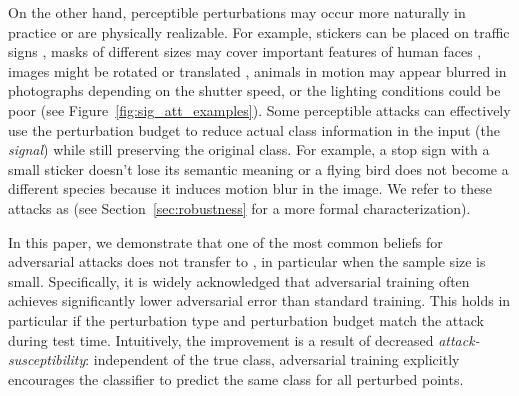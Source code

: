 On the other hand, perceptible perturbations may occur more naturally in practice or are physically realizable. 
For example, stickers can be placed on traffic signs \cite{Eykholt18},
masks of different sizes may cover important features of human faces
\cite{Wu20}, images might be rotated or translated \cite{Logan19},
animals in motion may appear blurred in photographs
depending on the shutter speed, or the lighting conditions could be poor (see Figure~\ref{fig:sig_att_examples}).
Some perceptible attacks can effectively
use the perturbation budget to reduce actual class information
in the input (the \emph{signal}) while still preserving the original class.
For example, a stop sign with a small sticker doesn't lose its semantic meaning
or a flying bird does not become a different species because it induces motion blur
in the image.
We refer to these attacks as \emph{\nameofattacks} (see
Section~\ref{sec:robustness} for a more formal
characterization). 

In this paper, we
demonstrate that one of the most common beliefs 
for adversarial attacks does not transfer to \nameofattacks, in
particular when the sample size is small. Specifically, it is widely acknowledged that adversarial training often achieves significantly lower adversarial error than standard
training. This holds in particular if %
the perturbation type 
\cite{madry18, zhang19, Bai21} and perturbation budget match the attack during test time. 
Intuitively, the improvement is a result of decreased
\emph{attack-susceptibility}: independent of the true class,
adversarial training explicitly encourages the classifier to predict
the same class for all perturbed points.







